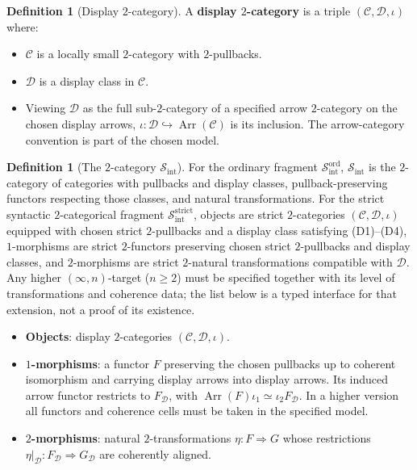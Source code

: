 \documentclass[11pt]{article}
\theoremstyle{plain}
\theoremstyle{definition}
\newtheorem{definition}[theorem]{Definition}
\newcommand{\cS}{\mathcal{S}}
\newcommand{\cC}{\mathcal{C}}
\newcommand{\cD}{\mathcal{D}}
\newcommand{\Sint}{\cS_{\mathrm{int}}}
\begin{document}
\begin{definition}[Display $2$-category]\label{def:display-2-cat}
A \textbf{display $2$-category} is a triple $(\cC, \cD, \iota)$ where:
\begin{itemize}
\item $\cC$ is a locally small $2$-category with $2$-pullbacks.
\item $\cD$ is a display class in $\cC$.
\item Viewing $\cD$ as the full sub-$2$-category of a specified arrow $2$-category on the chosen display arrows, $\iota:\cD\hookrightarrow\operatorname{Arr}(\cC)$ is its inclusion. The arrow-category convention is part of the chosen model.
\end{itemize}
\end{definition}

\begin{definition}[The $2$-category $\Sint$]\label{def:Sint}
For the ordinary fragment $\mathcal{S}_{\mathrm{int}}^{\mathrm{ord}}$, $\Sint$ is the $2$-category of categories with pullbacks and display classes, pullback-preserving functors respecting those classes, and natural transformations. For the strict syntactic $2$-categorical fragment $\mathcal{S}_{\mathrm{int}}^{\mathrm{strict}}$, objects are strict $2$-categories $(\cC, \cD, \iota)$ equipped with chosen strict $2$-pullbacks and a display class satisfying \textup{(D1)--(D4)}, $1$-morphisms are strict $2$-functors preserving chosen strict $2$-pullbacks and display classes, and $2$-morphisms are strict $2$-natural transformations compatible with $\cD$. Any higher $(\infty, n)$-target ($n \ge 2$) must be specified together with its level of transformations and coherence data; the list below is a typed interface for that extension, not a proof of its existence.
\begin{itemize}
\item \textbf{Objects}: display $2$-categories $(\cC, \cD, \iota)$.
\item \textbf{$1$-morphisms}: a functor $F$ preserving the chosen pullbacks up to coherent isomorphism and carrying display arrows into display arrows. Its induced arrow functor restricts to $F_\cD$, with $\operatorname{Arr}(F)\iota_1\simeq\iota_2F_\cD$. In a higher version all functors and coherence cells must be taken in the specified model.
\item \textbf{$2$-morphisms}: natural $2$-transformations $\eta : F \Rightarrow G$ whose restrictions $\eta|_\cD : F_\cD \Rightarrow G_\cD$ are coherently aligned.
\end{itemize}
\end{definition}
\end{document}
